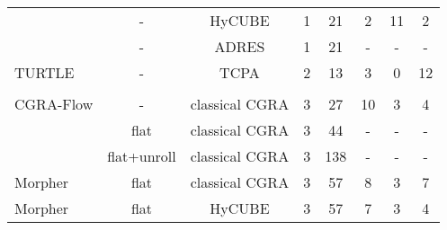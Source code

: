 \begin{table}
{\begin{tabular}{|l|c|c|c|c|c|c|c|}
 \rowcolor{darkOrange!50}{CGRA-ME}                    & {-}                                  & HyCUBE                               & 1                              & 21                            & 2                          & 11                                  & 2 \\
 \rowcolor{darkRed!50}{Pillars}                       & {-}                                  & ADRES                                & 1                              & 21                            & -                          & -                                   & - \\
 {TURTLE}                                               & {-}                                  & TCPA                               & 2                              & 13                            & 3                          & 0                                   & 12 \\ \hline\hline
 \rowcolor{darkGray} \multicolumn{8}{|c|}{\color{white}{\textbf{TRISOLV}}} \\\hline
 {CGRA-Flow}                                          & -                                    & classical CGRA                            & 3                              & 27                            & 10                         & 3                                   & 4\\ 
 \rowcolor{darkRed!50}{CGRA-Flow}                     & flat                                 & classical CGRA                            & 3                              & 44                            & -                          & -                                   & -\\ 
 \rowcolor{darkRed!50}{CGRA-Flow}                     & flat+unroll                          & classical CGRA                            & 3                              & 138                           & -                          & -                                   & -\\ 
 {Morpher}                                            & {flat}                               & classical CGRA                            & 3                              & 57                            & 8                          & 3                                   & 7 \\ 
 {Morpher}                                            & {flat}                               & HyCUBE                               & 3                              & 57                            & 7                          & 3                                   & 4 \\

\end{tabular}}
\end{table}
